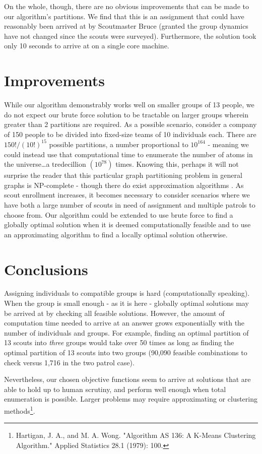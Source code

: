 \documentclass{amsart}
\theoremstyle{definition}
\theoremstyle{remark}
\numberwithin{equation}{section}
\begin{document}
On the whole, though, there are no obvious improvements that can be made to our algorithm's partitions. We find that this is an assignment that could have reasonably been arrived at by Scoutmaster Bruce (granted the group dynamics have not changed since the scouts were surveyed).  Furthermore, the solution took only 10 seconds to arrive at on a single core machine.

\section*{Improvements}
While our algorithm demonstrably works well on smaller groups of 13 people, we do not expect our brute force solution to be tractable on larger groups wherein greater than 2 partitions are required. As a possible scenario, consider a company of 150 people to be divided into fixed-size teams of 10 individuals each. There are $150! / (10!)^{15}$ possible partitions, a number proportional to $10^{164}$ - meaning we could instead use that computational time to enumerate the number of atoms in the universe\ldots a tredecillion $(10^{78})$ times. Knowing this, perhaps it will not surprise the reader that this particular graph partitioning problem in general graphs is NP-complete - though there do exist approximation algorithms \cite{A}.
As scout enrollment increases, it becomes necessary to consider scenarios where we have both a large number of scouts in need of assignment and multiple patrols to choose from. Our algorithm could be extended to use brute force to find a globally optimal solution when it is deemed computationally feasible and to use an approximating algorithm to find a locally optimal solution otherwise. 

\section*{Conclusions}
Assigning individuals to compatible groups is hard (computationally speaking). When the group is small enough - as it is here - globally optimal solutions may be arrived at by checking all feasible solutions. However, the amount of computation time needed to arrive at an answer grows exponentially with the number of individuals and groups. For example, finding an optimal partition of 13 scouts into \textit{three} groups would take over 50 times as long as finding the optimal partition of 13 scouts into two groups (90,090 feasible combinations to check versus 1,716 in the two patrol case).

Nevertheless, our chosen objective functions seem to arrive at solutions that are able to hold up to human scrutiny, and perform well enough when total enumeration is possible. Larger problems may require approximating or clustering methods\footnote{Hartigan, J. A., and M. A. Wong. "Algorithm AS 136: A K-Means Clustering Algorithm." Applied Statistics 28.1 (1979): 100.}. 
\end{document}
